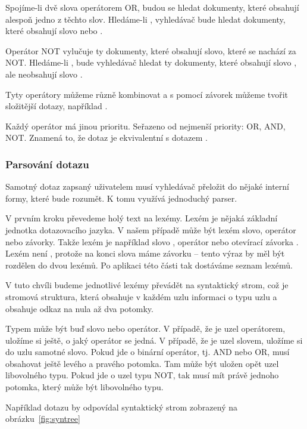 \documentclass[12pt]{article}
\newcommand{\sssection}[1]{\subsubsection{#1}}
\begin{document}
Spojíme-li dvě slova operátorem OR, budou se hledat dokumenty, které obsahují alespoň jedno z těchto slov. Hledáme-li , vyhledávač bude hledat dokumenty, které obsahují slovo  nebo .

Operátor NOT vylučuje ty dokumenty, které obsahují slovo, které se nachází za NOT. Hledáme-li , bude vyhledávač hledat ty dokumenty, které obsahují slovo , ale neobsahují slovo . 

Tyty operátory můžeme různě kombinovat a s pomocí závorek můžeme tvořit složitější dotazy, například . 

Každý operátor má jinou prioritu. Seřazeno od nejmenší priority: OR, AND, NOT. Znamená to, že dotaz  je ekvivalentní s dotazem .

\sssection{Parsování dotazu}

Samotný dotaz zapsaný uživatelem musí vyhledávač přeložit do nějaké interní formy, které bude rozumět. K tomu využívá jednoduchý parser. 

V prvním kroku převedeme holý text na lexémy. Lexém je nějaká základní jednotka dotazovacího jazyka. V našem případě může být lexém slovo, operátor nebo závorky. Takže lexém je například slovo , operátor  nebo otevírací závorka \uv{(}. Lexém není , protože na konci slova máme závorku -- tento výraz by měl být rozdělen do dvou lexémů. Po aplikaci této části tak dostáváme seznam lexémů. 

V tuto chvíli budeme jednotlivé lexémy převádět na syntaktický strom, což je stromová struktura, která obsahuje v každém uzlu informaci o typu uzlu a obsahuje odkaz na nula až dva potomky. 

Typem může být buď slovo nebo operátor. V případě, že je uzel operátorem, uložíme si ještě, o jaký operátor se jedná. V případě, že je uzel slovem, uložíme si do uzlu samotné slovo. Pokud jde o binární operátor, tj. AND nebo OR, musí obsahovat ještě levého a pravého potomka. Tam může být uložen opět uzel libovolného typu. Pokud jde o uzel typu NOT, tak musí mít právě jednoho potomka, který může být libovolného typu. 

Například dotazu  by odpovídal syntaktický strom zobrazený na obrázku~\ref{fig:syntree}
\end{document}
